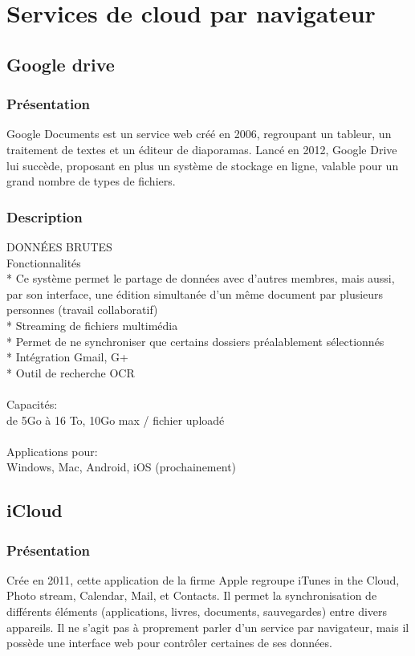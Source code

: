 \chapter{Services de cloud par navigateur}
\thispagestyle{EIP} %

\section{Google drive}

\subsection{Présentation}
Google Documents est un service web créé en 2006, regroupant un tableur, un traitement de textes et un éditeur de diaporamas.
Lancé en 2012, Google Drive lui succède, proposant en plus un système de stockage en ligne, valable pour un grand nombre de types de fichiers.\\

\subsection{Description}
DONNÉES BRUTES\\
Fonctionnalités\\
* Ce système permet le partage de données avec d'autres membres, mais aussi, par son interface, une édition simultanée d'un même document par plusieurs personnes (travail collaboratif)\\
* Streaming de fichiers multimédia\\
* Permet de ne synchroniser que certains dossiers préalablement sélectionnés\\
* Intégration Gmail, G+\\
* Outil de recherche OCR\\
\\
Capacités:\\
de 5Go à 16 To, 10Go max / fichier uploadé\\
\\
Applications pour:\\
Windows, Mac, Android, iOS (prochainement)\\


\section{iCloud}

\subsection{Présentation}
Crée en 2011, cette application de la firme Apple regroupe iTunes in the Cloud, Photo stream, Calendar, Mail, et Contacts. Il permet la synchronisation de différents éléments (applications, livres, documents, sauvegardes) entre divers appareils. Il ne s'agit pas à proprement parler d'un service par navigateur, mais il possède une interface web pour contrôler certaines de ses données.\\

